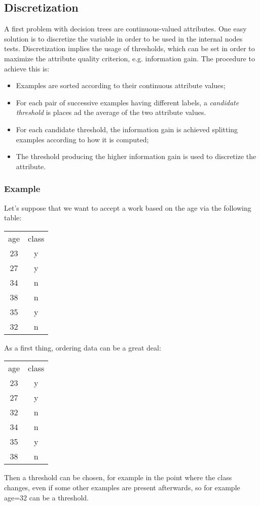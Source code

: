 \subsection{Discretization}
A first problem with decision trees are continuous-valued attributes. One easy solution is to discretize the variable in order to be used in the internal nodes tests. \newline
Discretization implies the usage of thresholds, which can be set in order to maximize the attribute quality criterion, e.g. information gain. \newline
The procedure to achieve this is:
\begin{itemize}
	\item Examples are sorted according to their continuous attribute values;
	\item For each pair of successive examples having different labels, a \textit{candidate threshold} is places ad the average of the two attribute values.
	\item For each candidate threshold, the information gain is achieved splitting examples according to how it is computed;
	\item The threshold producing the higher information gain is used to discretize the attribute. 
\end{itemize}
%
\subsubsection{Example}
Let's suppose that we want to accept a work based on the age via the following table:
\begin{center}
\begin{tabular}{c|c}
	age&class\\
	23&y\\
	27&y\\
	34&n\\
	38&n\\
	35&y\\
	32&n\\
\end{tabular}
\end{center}
As a first thing, ordering data can be a great deal:
\begin{center}
\begin{tabular}{c|c}
	age&class\\
	23&y\\
	27&y\\
	32&n\\
	34&n\\
	35&y\\
	38&n\\
\end{tabular}
\end{center}
Then a threshold can be chosen, for example in the point where the class changes, even if some other examples are present afterwards, so for example age=32 can be a threshold.\newline
%
%

